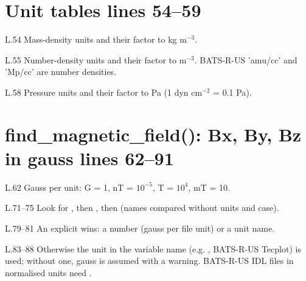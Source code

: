 \section*{\normalsize Unit tables \hfill{\small\mdseries\color{gray}lines 54--59}}

\begin{lines}
\item[L.54] Mass-density units and their factor to kg m$^{-3}$.
\item[L.55] Number-density units and their factor to m$^{-3}$. BATS-R-US 'amu/cc' and 'Mp/cc' are number densities.
\item[L.58] Pressure units and their factor to Pa (1 dyn cm$^{-2}$ = 0.1 Pa).
\end{lines}
\section*{\normalsize find\_magnetic\_field(): Bx, By, Bz in gauss \hfill{\small\mdseries\color{gray}lines 62--91}}

\begin{lines}
\item[L.62] Gauss per unit: G = 1, nT = $10^{-5}$, T = $10^4$, mT = 10.
\item[L.71–75] Look for , then , then  (names compared without units and case).
\item[L.79–81] An explicit  wins: a number (gauss per file unit) or a unit name.
\item[L.83–88] Otherwise the unit in the variable name (e.g. , BATS-R-US Tecplot) is used; without one, gauss is assumed with a warning. BATS-R-US IDL files in normalised units need .
\end{lines}
